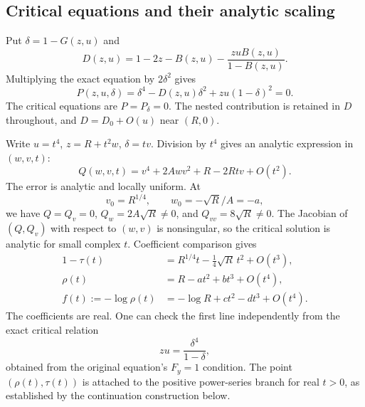 \documentclass[11pt,letterpaper]{article}
\numberwithin{equation}{section}
\theoremstyle{definition}\newtheorem{definition}[theorem]{Definition}
\theoremstyle{remark}\newtheorem{remark}[theorem]{Remark}
\begin{document}
\subsection{Critical equations and their analytic scaling}
Put $\delta=1-G(z,u)$ and
\begin{equation}\label{gal:cx:eq:D}
D(z,u)=1-2z-B(z,u)-\frac{zuB(z,u)}{1-B(z,u)}.
\end{equation}
Multiplying the exact equation by $2\delta^2$ gives
\begin{equation}\label{gal:cx:eq:quartic}
P(z,u,\delta)=\delta^4-D(z,u)\delta^2+zu(1-\delta)^2=0.
\end{equation}
The critical equations are $P=P_\delta=0$. The nested contribution is retained in $D$ throughout, and $D=D_0+O(u)$ near $(R,0)$.

Write $u=t^4$, $z=R+t^2w$, $\delta=tv$. Division by $t^4$ gives an analytic expression in $(w,v,t)$:
\begin{equation}\label{gal:cx:eq:Q}
Q(w,v,t)=v^4+2Awv^2+R-2Rtv+O(t^2).
\end{equation}
The error is analytic and locally uniform. At
\[
v_0=R^{1/4},\qquad w_0=-\sqrt R/A=-a,
\]
we have $Q=Q_v=0$, $Q_w=2A\sqrt R\ne0$, and $Q_{vv}=8\sqrt R\ne0$. The Jacobian of $(Q,Q_v)$ with respect to $(w,v)$ is nonsingular, so the critical solution is analytic for small complex $t$. Coefficient comparison gives
\begin{equation}\label{gal:cx:eq:critical}
\begin{aligned}
1-\tau(t)&=R^{1/4}t-\tfrac14\sqrt R\,t^2+O(t^3),\\
\rho(t)&=R-at^2+bt^3+O(t^4),\\
f(t):=-\log\rho(t)&=-\log R+ct^2-dt^3+O(t^4).
\end{aligned}
\end{equation}
The coefficients are real. One can check the first line independently from the exact critical relation
\begin{equation}\label{gal:cx:eq:char}
zu=\frac{\delta^4}{1-\delta},
\end{equation}
obtained from the original equation's $F_y=1$ condition.
The point $(\rho(t),\tau(t))$ is attached to the positive power-series branch for real $t>0$, as established by the continuation construction below.
\end{document}
